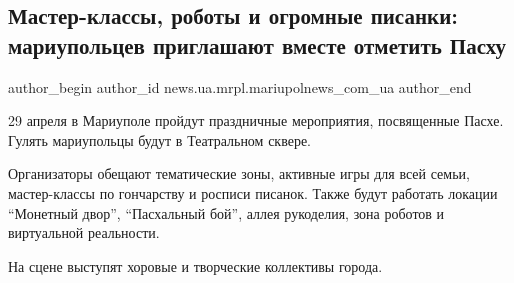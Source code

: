  
 
 
 
 
 
\subsection{Мастер-классы, роботы и огромные писанки: мариупольцев приглашают вместе отметить Пасху}
\label{sec:21_04_2019.stz.news.ua.mrpl.mariupolnews_com_ua.1.master_klassy_roboty_pysanky}
 
\ifcmt
 author_begin
   author_id news.ua.mrpl.mariupolnews_com_ua
 author_end
\fi


29 апреля в Мариуполе пройдут праздничные мероприятия, посвященные Пасхе.
Гулять мариупольцы будут в Театральном сквере.

Организаторы обещают тематические зоны, активные игры для всей семьи,
мастер-классы по гончарству и росписи писанок. Также будут работать локации
\enquote{Монетный двор}, \enquote{Пасхальный бой}, аллея рукоделия, зона роботов и виртуальной
реальности.

На сцене выступят хоровые и творческие коллективы города.
